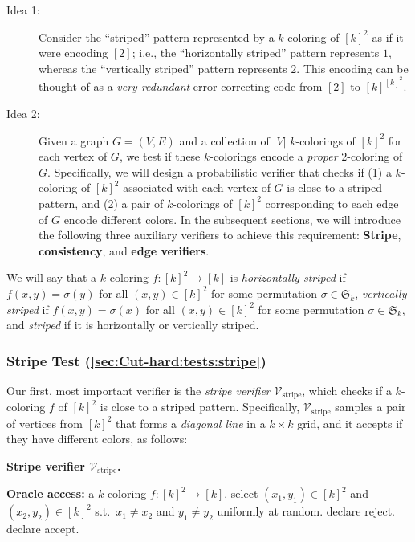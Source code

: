 \documentclass[11pt,fleqn]{article}
\newcommand{\V}{\calV}
\newcommand{\Accept}{\textsf{accept}\xspace}
\newcommand{\Reject}{\textsf{reject}\xspace}
\newcommand{\f}{f}
\newcommand{\Vstripe}{\V_\mathrm{stripe}}
\newcommand{\calV}{\mathcal{V}}
\newcommand{\frakS}{\mathfrak{S}}
\theoremstyle{definition}
\numberwithin{equation}{section}
\begin{document}
\begin{description}
    \item[Idea 1:]
        Consider the ``striped'' pattern represented by
        a $k$-coloring of $[k]^2$
        as if it were encoding $[2]$; i.e.,
        the ``horizontally striped'' pattern represents $1$, whereas
        the ``vertically striped'' pattern represents $2$.
        This encoding can be thought of as a \emph{very redundant} error-correcting code
        from $[2]$ to $[k]^{[k]^2}$.
    
    \item[Idea 2:]
        Given a graph $G=(V,E)$ and
        a collection of $|V|$ $k$-colorings of $[k]^2$ for each vertex of $G$,
        we test if these $k$-colorings encode a \emph{proper} $2$-coloring of $G$.
        Specifically, we will design a probabilistic verifier that checks if
        (1) a $k$-coloring of $[k]^2$ associated with each vertex of $G$ is close to a striped pattern, and
        (2) a pair of $k$-colorings of $[k]^2$ corresponding to each edge of $G$ encode different colors.
        In the subsequent sections,
        we will introduce the following three auxiliary verifiers to achieve this requirement:
        \textbf{Stripe}, \textbf{consistency}, and \textbf{edge verifiers}.
\end{description}


We will say that a $k$-coloring $\f \colon [k]^2 \to [k]$
is \emph{horizontally striped} if 
$\f(x,y) = \sigma(y)$ for all $(x,y) \in [k]^2$
for some permutation $\sigma \in \frakS_k$,
\emph{vertically striped} if
$\f(x,y) = \sigma(x)$ for all $(x,y) \in [k]^2$
for some permutation $\sigma \in \frakS_k$, and
\emph{striped} if
it is horizontally or vertically striped.


\subsubsection{Stripe Test (\cref{sec:Cut-hard:tests:stripe})}
Our first, most important verifier is the \emph{stripe verifier} $\Vstripe$, which checks
if a $k$-coloring $\f$ of $[k]^2$ is close to a striped pattern.
Specifically,
$\Vstripe$ samples a pair of vertices from $[k]^2$ that forms a \emph{diagonal line} in a $k \times k$ grid, and
it accepts if they have different colors, as follows:

\begin{itembox}[l]{\textbf{Stripe verifier $\Vstripe$.}}
\begin{algorithmic}[1]
    \item[\textbf{Oracle access:}]
        a $k$-coloring $\f \colon [k]^2 \to [k]$.
    \State select $(x_1,y_1) \in [k]^2$ and $(x_2,y_2) \in [k]^2$
        s.t.~$x_1 \neq x_2$ and $y_1 \neq y_2$ uniformly at random.
    \If{$\f(x_1,y_1) = \f(x_2,y_2)$}
        \State declare \Reject.
    \Else
        \State declare \Accept.
    \EndIf
\end{algorithmic}
\end{itembox}
\end{document}
